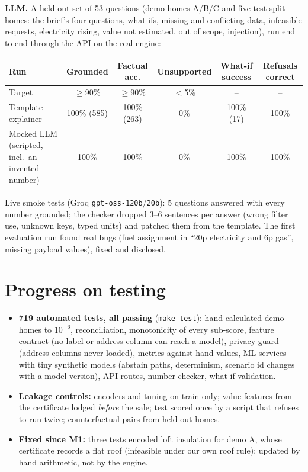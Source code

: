 \documentclass[10pt,a4paper]{article}
\begin{document}
\textbf{LLM.} A held-out set of 53 questions (demo homes A/B/C and five test-split homes: the brief's four questions,
what-ifs, missing and conflicting data, infeasible requests, electricity rising, value not estimated, out of scope,
injection), run end to end through the API on the real engine:
\vspace{-3pt}
\begin{center}\small
\begin{tabularx}{\linewidth}{@{}Xccccc@{}}
\toprule
Run & Grounded & Factual acc. & Unsupported & What-if success & Refusals correct \\
\midrule
Target & $\ge$90\% & $\ge$90\% & $<$5\% & -- & -- \\
Template explainer & 100\% (585) & 100\% (263) & 0\% & 100\% (17) & 100\% \\
Mocked LLM (scripted, incl.\ an invented number) & 100\% & 100\% & 0\% & 100\% & 100\% \\
\bottomrule
\end{tabularx}
\end{center}
\vspace{-3pt}
Live smoke tests (Groq \texttt{gpt-oss-120b}/\texttt{20b}): 5 questions answered with every number grounded; the checker
dropped 3--6 sentences per answer (wrong filter use, unknown keys, typed units) and patched them from the template.
The first evaluation run found real bugs (fuel assignment in ``20p electricity and 6p gas'', missing payload values),
fixed and disclosed.

\section{Progress on testing}
\begin{itemize}
\item \textbf{719 automated tests, all passing} (\texttt{make test}): hand-calculated demo homes to $10^{-6}$,
reconciliation, monotonicity of every sub-score, feature contract (no label or address column can reach a model),
privacy guard (address columns never loaded), metrics against hand values, ML services with tiny synthetic models
(abstain paths, determinism, scenario id changes with a model version), API routes, number checker, what-if validation.
\item \textbf{Leakage controls:} encoders and tuning on train only; value features from the certificate lodged
\emph{before} the sale; test scored once by a script that refuses to run twice; counterfactual pairs from held-out homes.
\item \textbf{Fixed since M1:} three tests encoded loft insulation for demo A, whose certificate records a flat roof
(infeasible under our own roof rule); updated by hand arithmetic, not by the engine.
\end{itemize}
\end{document}

